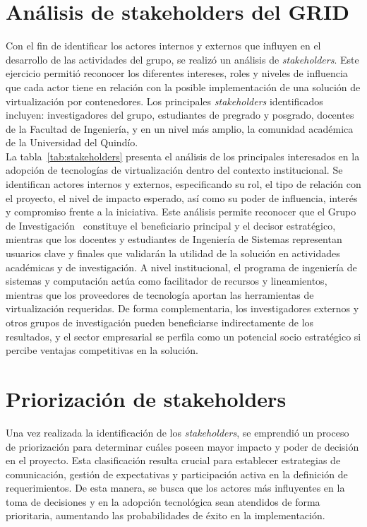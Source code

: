 \section{Análisis de stakeholders del GRID}\label{sec:stakeholders}
\noindent
Con el fin de identificar los actores internos y externos que influyen en el desarrollo de las actividades del grupo, se realizó un análisis de \textit{stakeholders}. Este ejercicio permitió reconocer los diferentes intereses, roles y niveles de influencia que cada actor tiene en relación con la posible implementación de una solución de virtualización por contenedores. Los principales \textit{stakeholders} identificados incluyen: investigadores del grupo, estudiantes de pregrado y posgrado, docentes de la Facultad de Ingeniería, y en un nivel más amplio, la comunidad académica de la Universidad del Quindío.\\
La tabla~\ref{tab:stakeholders} presenta el análisis de los principales interesados en la adopción de tecnologías de virtualización dentro del contexto institucional. Se identifican actores internos y externos, especificando su rol, el tipo de relación con el proyecto, el nivel de impacto esperado, así como su poder de influencia, interés y compromiso frente a la iniciativa. Este análisis permite reconocer que el Grupo de Investigación \GRID\ constituye el beneficiario principal y el decisor estratégico, mientras que los docentes y estudiantes de Ingeniería de Sistemas representan usuarios clave y finales que validarán la utilidad de la solución en actividades académicas y de investigación. A nivel institucional, el programa de ingeniería de sistemas y computación actúa como facilitador de recursos y lineamientos, mientras que los proveedores de tecnología aportan las herramientas de virtualización requeridas. De forma complementaria, los investigadores externos y otros grupos de investigación pueden beneficiarse indirectamente de los resultados, y el sector empresarial se perfila como un potencial socio estratégico si percibe ventajas competitivas en la solución.


\section{Priorización de stakeholders}
\noindent
Una vez realizada la identificación de los \textit{stakeholders}, se emprendió un proceso de priorización para determinar cuáles poseen mayor impacto y poder de decisión en el proyecto. Esta clasificación resulta crucial para establecer estrategias de comunicación, gestión de expectativas y participación activa en la definición de requerimientos. De esta manera, se busca que los actores más influyentes en la toma de decisiones y en la adopción tecnológica sean atendidos de forma prioritaria, aumentando las probabilidades de éxito en la implementación.

